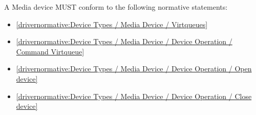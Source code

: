 \label{sec:Conformance / Device Conformance / Media Device Conformance}

A Media device MUST conform to the following normative statements:

\begin{itemize}
\item \ref{drivernormative:Device Types / Media Device / Virtqueues}
\item \ref{drivernormative:Device Types / Media Device / Device Operation / Command Virtqueue}
\item \ref{drivernormative:Device Types / Media Device / Device Operation / Open device}
\item \ref{drivernormative:Device Types / Media Device / Device Operation / Close device}
\end{itemize}